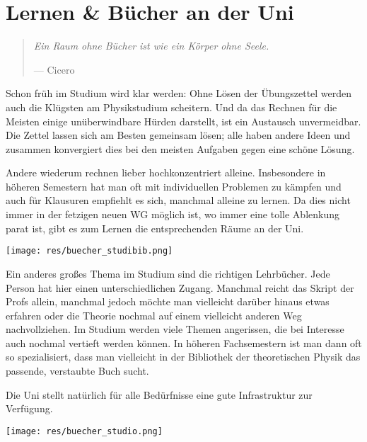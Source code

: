 \section{Lernen \& Bücher an der Uni}
\begin{multicols*}{2}
\begin{quote}
	\textit{Ein Raum ohne Bücher ist wie ein Körper ohne Seele.}
	
	\hfill--- Cicero
\end{quote}
Schon früh im Studium wird klar werden: Ohne Lösen der Übungszettel werden auch die Klügsten am Physikstudium scheitern.
Und da das Rechnen für die Meisten einige unüberwindbare Hürden darstellt, ist ein Austausch unvermeidbar.
Die Zettel lassen sich am Besten gemeinsam lösen; alle haben andere Ideen und zusammen konvergiert dies bei den meisten Aufgaben gegen eine schöne Lösung.

Andere wiederum rechnen lieber hochkonzentriert alleine.
Insbesondere in höheren Semestern hat man oft mit individuellen Problemen zu kämpfen und auch für Klausuren empfiehlt es sich, manchmal alleine zu lernen.
Da dies nicht immer in der fetzigen neuen WG möglich ist, wo immer eine tolle Ablenkung parat ist, gibt es zum Lernen die entsprechenden Räume an der Uni.

\texttt{[image: res/buecher\_studibib.png]}

Ein anderes großes Thema im Studium sind die richtigen Lehrbücher.
Jede Person hat hier einen unterschiedlichen Zugang.
Manchmal reicht das Skript der Profs allein, manchmal jedoch möchte man vielleicht darüber hinaus etwas erfahren oder die Theorie nochmal auf einem vielleicht anderen Weg nachvollziehen.
Im Studium werden viele Themen angerissen, die bei Interesse auch nochmal vertieft werden können.
In höheren Fachsemestern ist man dann oft so spezialisiert, dass man vielleicht in der Bibliothek der theoretischen Physik das passende, verstaubte Buch sucht.

Die Uni stellt natürlich für alle Bedürfnisse eine gute Infrastruktur zur Verfügung.

\texttt{[image: res/buecher\_studio.png]}


\end{multicols*}
